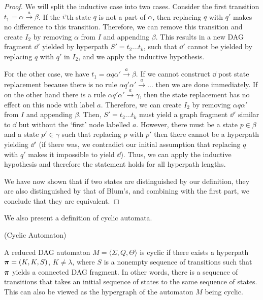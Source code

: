 \documentclass[11pt]{article}
\begin{document}
\begin{proof}
  We will split the inductive case into two cases. Consider the first transition
  $t_1 = \alpha \xrightarrow{a} \beta$. If the $i$'th state $q$ is not a part of
  $\alpha$, then replacing $q$ with $q'$ makes no difference to this transition.
  Therefore, we can remove this transition and create $I_2$ by removing $\alpha$
  from $I$ and appending $\beta$. This results in a new DAG fragment $\dd'$
  yielded by hyperpath $S' = t_2\ldots t_k$, such that $\dd'$ cannot be yielded
  by replacing $q$ with $q'$ in $I_2$, and we apply the inductive hypothesis. 

  For the other case, we have $t_1 = \alpha q \alpha' \xrightarrow{a} \beta$. If
  we cannot construct $\dd$ post state replacement because there is no rule
  $\alpha q' \alpha' \xrightarrow{a} \ldots$ then we are done immediately. If on
  the other hand there is a rule $\alpha q' \alpha' \xrightarrow{a} \gamma$,
  then the state replacement has no effect on this node with label $a$.
  Therefore, we can create $I_2$ by removing  $\alpha q \alpha'$ from $I$ and
  appending $\beta$. Then, $S' = t_2 \ldots t_k$ must yield a graph fragment
  $\dd'$ similar to $\dd$ but without the `first' node labelled $a$. However,
  there must be a state $p \in \beta$ and a state $p' \in \gamma$ such that
  replacing $p$ with $p'$ then there cannot be a hyperpath yielding $\dd'$ (if
  there was, we contradict our initial assumption that replacing $q$ with $q'$
  makes it impossible to yield $\dd$). Thus, we can apply the inductive
  hypothesis and therefore the statement holds for all hyperpath lengths.

  We have now shown that if two states are distinguished by our definition, they
  are also distinguished by that of Blum's, and combining with the first part,
  we conclude that they are equivalent. 
\end{proof}

We also present a definition of cyclic automata.

\begin{definition}
  (Cyclic Automaton)

  A reduced DAG automaton $M =  \langle \Sigma, Q, \Theta \rangle$ is cyclic if
  there exists a hyperpath $ \boldsymbol{\pi} = (K,K,S)$, $K \ne \lambda$, where $S$ is a nonempty sequence
  of transitions such that $\boldsymbol{\pi}$ yields a connected DAG fragment. In other
  words, there is a sequence of transitions that takes an initial sequence of
  states to the same sequence of states. This can also be viewed as the
  hypergraph of the automaton $M$ being cyclic. 
\end{definition}
\end{document}
